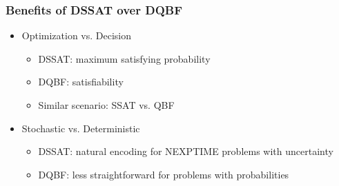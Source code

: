 \begin{frame}
      \frametitle{Benefits of DSSAT over DQBF}
      \begin{itemize}
            \item Optimization vs. Decision
                  \begin{itemize}
                        \item DSSAT: maximum satisfying probability
                        \item DQBF: satisfiability
                        \item Similar scenario: SSAT vs. QBF
                  \end{itemize}
                  \pause
            \item Stochastic vs. Deterministic
                  \begin{itemize}
                        \item DSSAT: natural encoding for NEXPTIME problems with uncertainty
                        \item DQBF: less straightforward for problems with probabilities
                  \end{itemize}
      \end{itemize}
\end{frame}